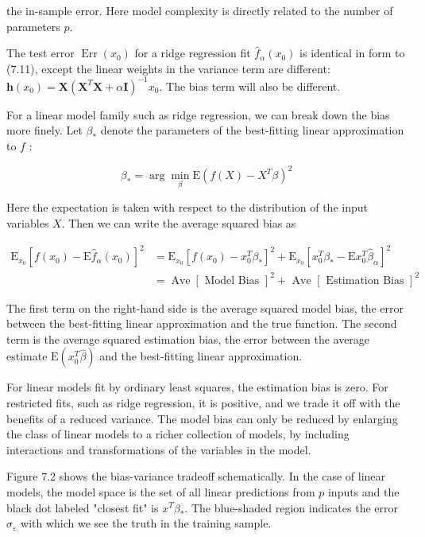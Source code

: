 \documentclass[10pt]{article}
\begin{document}
the in-sample error. Here model complexity is directly related to the number of parameters $p$.

The test error $\operatorname{Err}\left(x_{0}\right)$ for a ridge regression fit $\hat{f}_{\alpha}\left(x_{0}\right)$ is identical in form to (7.11), except the linear weights in the variance term are different: $\mathbf{h}\left(x_{0}\right)=\mathbf{X}\left(\mathbf{X}^{T} \mathbf{X}+\alpha \mathbf{I}\right)^{-1} x_{0}$. The bias term will also be different.

For a linear model family such as ridge regression, we can break down the bias more finely. Let $\beta_{*}$ denote the parameters of the best-fitting linear approximation to $f$ :


\begin{equation*}
\beta_{*}=\arg \min _{\beta} \mathrm{E}\left(f(X)-X^{T} \beta\right)^{2} \tag{7.13}
\end{equation*}


Here the expectation is taken with respect to the distribution of the input variables $X$. Then we can write the average squared bias as


\begin{align*}
\mathrm{E}_{x_{0}}\left[f\left(x_{0}\right)-\mathrm{E} \hat{f}_{\alpha}\left(x_{0}\right)\right]^{2} & =\mathrm{E}_{x_{0}}\left[f\left(x_{0}\right)-x_{0}^{T} \beta_{*}\right]^{2}+\mathrm{E}_{x_{0}}\left[x_{0}^{T} \beta_{*}-\mathrm{E} x_{0}^{T} \hat{\beta}_{\alpha}\right]^{2} \\
& =\operatorname{Ave}[\text { Model Bias }]^{2}+\text { Ave }[\text { Estimation Bias }]^{2} \tag{7.14}
\end{align*}


The first term on the right-hand side is the average squared model bias, the error between the best-fitting linear approximation and the true function. The second term is the average squared estimation bias, the error between the average estimate $\mathrm{E}\left(x_{0}^{T} \hat{\beta}\right)$ and the best-fitting linear approximation.

For linear models fit by ordinary least squares, the estimation bias is zero. For restricted fits, such as ridge regression, it is positive, and we trade it off with the benefits of a reduced variance. The model bias can only be reduced by enlarging the class of linear models to a richer collection of models, by including interactions and transformations of the variables in the model.

Figure 7.2 shows the bias-variance tradeoff schematically. In the case of linear models, the model space is the set of all linear predictions from $p$ inputs and the black dot labeled "closest fit" is $x^{T} \beta_{*}$. The blue-shaded region indicates the error $\sigma_{\varepsilon}$ with which we see the truth in the training sample.
\end{document}
